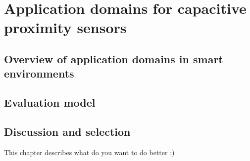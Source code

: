 \chapter{Application domains for capacitive proximity sensors}
\section{Overview of application domains in smart environments}
\section{Evaluation model}
\section{Discussion and selection}

This chapter describes what do you want to do better :)